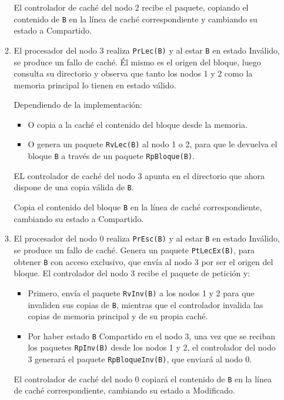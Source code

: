 \begin{ejercicio}
\begin{enumerate}
\begin{enumerate}
            El controlador de caché del nodo 2 recibe el paquete, copiando el contenido de \verb|B| en la línea de caché correspondiente y cambiando su estado a Compartido.
        
        \item El procesador del nodo 3 realiza \verb|PrLec(B)| y al estar \verb|B| en estado Inválido, se produce un fallo de caché. Él mismo es el origen del bloque, luego consulta su directorio y observa que tanto los nodos 1 y 2 como la memoria principal lo tienen en estado válido.

            Dependiendo de la implementación:
            \begin{itemize}
                \item O copia a la caché el contenido del bloque desde la memoria.
                \item O genera un paquete \verb|RvLec(B)| al nodo 1 o 2, para que le devuelva el bloque \verb|B| a través de un paquete \verb|RpBloque(B)|.
            \end{itemize}
            EL controlador de caché del nodo 3 apunta en el directorio que ahora dispone de una copia válida de \verb|B|.

            Copia el contenido del bloque \verb|B| en la línea de caché correspondiente, cambiando su estado a Compartido.
        
        \item El procesador del nodo 0 realiza \verb|PrEsc(B)| y al estar \verb|B| en estado Inválido, se produce un fallo de caché. Genera un paquete \verb|PtLecEx(B)|, para obtener \verb|B| con acceso exclusivo, que envía al nodo 3 por ser el origen del bloque. El controlador del nodo 3 recibe el paquete de petición y:
            \begin{itemize}
                \item Primero, envía el paquete \verb|RvInv(B)| a los nodos 1 y 2 para que invaliden sus copias de \verb|B|, mientras que el controlador invalida las copias de memoria principal y de su propia caché.
                \item Por haber estado \verb|B| Compartido en el nodo 3, una vez que se reciban los paquetes \verb|RpInv(B)| desde los nodos 1 y 2, el controlador del nodo 3 generará el paquete \verb|RpBloqueInv(B)|, que enviará al nodo 0.
            \end{itemize}

            El controlador de caché del nodo 0 copiará el contenido de \verb|B| en la línea de caché correspondiente, cambiando su estado a Modificado.
    \end{enumerate}

\end{enumerate}

\end{ejercicio}

